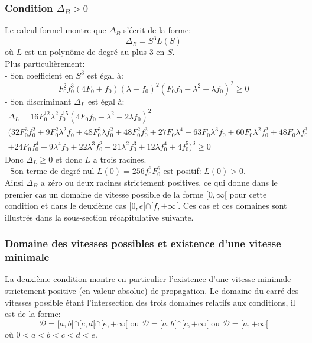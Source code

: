 \documentclass[11pt]{article}
\begin{document}
\subsubsection{Condition $\Delta_B >0$}
Le calcul formel montre que $\Delta_B$ s’écrit de la forme: \begin{equation}
	\Delta_B = S^3 L(S)
\end{equation}
où $L$ est un polynôme de degré au plus 3 en $S$. \\
Plus particulièrement:\\
- Son coefficient en $S^3 $ est égal à: \begin{equation}
	F_{0}^{2} f_{0}^{3} \left(4 F_{0} + f_{0} \right)  \left( \lambda + f_{0} \right)^{2}  \left(F_{0} f_{0} -  \lambda^{2} -  \lambda f_{0} \right)^{2} \geq 0
\end{equation} 
- Son discriminant $\Delta_L$ est égal à: \begin{multline} \Delta_L =16 F_{0}^{12} \lambda^{2} f_{0}^{15} \left(4 F_{0} f_{0} - \lambda^{2} - 2 \lambda f_{0}\right)^{2}\\ (32 F_{0}^{3} f_{0}^{2} + 9 F_{0}^{2} \lambda^{2} f_{0} + 48 F_{0}^{2} \lambda f_{0}^{2} + 48 F_{0}^{2} f_{0}^{3} + 27 F_{0} \lambda^{4} + 63 F_{0} \lambda^{3} f_{0} + 60 F_{0} \lambda^{2} f_{0}^{2} + 48 F_{0} \lambda f_{0}^{3} \\ + 24 F_{0} f_{0}^{4} + 9 \lambda^{4} f_{0} + 22 \lambda^{3} f_{0}^{2} + 21 \lambda^{2} f_{0}^{3} + 12 \lambda f_{0}^{4} + 4 f_{0}^{5})^{3} \geq 0 \end{multline}
Donc $\Delta_L \geq 0 $ et donc $L$ a trois racines.\\
- Son terme de degré nul $L(0)=256f_0^6F_0^6$ est positif: $L(0)>0$.\\
Ainsi $\Delta_B$ a zéro ou deux racines strictement positives, ce qui donne dans le premier cas un domaine de vitesse possible de la forme $[0,\infty[$ pour cette condition et dans le deuxième cas $[0,e[\cap[f,+\infty[.$ Ces cas et ces domaines sont illustrés dans la sous-section récapitulative suivante.
\subsubsection{Domaine des vitesses possibles et existence d'une vitesse minimale}
La deuxième condition montre en particulier l'existence d'une vitesse minimale strictement positive (en valeur absolue) de propagation. 
Le domaine du carré des vitesses possible étant l'intersection des trois domaines relatifs aux conditions, il est de la forme:
\begin{equation}
	\mathcal{D}=[a,b[\cap[c,d[\cap[e,+\infty[ \text{ ou } \mathcal{D}=[a,b[\cap[c,+\infty[ \text{ ou } \mathcal{D}=[a,+\infty[
\end{equation}
où $0<a<b<c<d<e$.\\
\newpage
\end{document}

